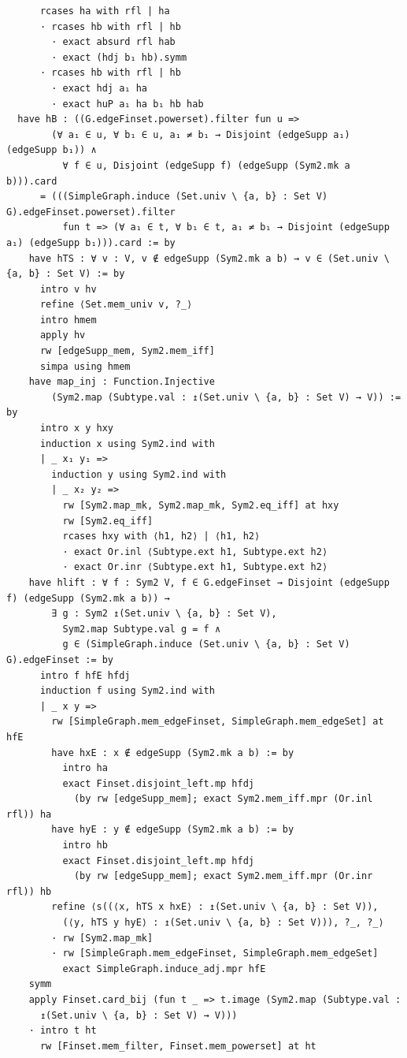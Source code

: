 \documentclass[11pt]{article}
\theoremstyle{definition}
\begin{document}
\begin{lstlisting}
      rcases ha with rfl | ha
      · rcases hb with rfl | hb
        · exact absurd rfl hab
        · exact (hdj b₁ hb).symm
      · rcases hb with rfl | hb
        · exact hdj a₁ ha
        · exact huP a₁ ha b₁ hb hab
  have hB : ((G.edgeFinset.powerset).filter fun u =>
        (∀ a₁ ∈ u, ∀ b₁ ∈ u, a₁ ≠ b₁ → Disjoint (edgeSupp a₁) (edgeSupp b₁)) ∧
          ∀ f ∈ u, Disjoint (edgeSupp f) (edgeSupp (Sym2.mk a b))).card
      = (((SimpleGraph.induce (Set.univ \ {a, b} : Set V) G).edgeFinset.powerset).filter
          fun t => (∀ a₁ ∈ t, ∀ b₁ ∈ t, a₁ ≠ b₁ → Disjoint (edgeSupp a₁) (edgeSupp b₁))).card := by
    have hTS : ∀ v : V, v ∉ edgeSupp (Sym2.mk a b) → v ∈ (Set.univ \ {a, b} : Set V) := by
      intro v hv
      refine ⟨Set.mem_univ v, ?_⟩
      intro hmem
      apply hv
      rw [edgeSupp_mem, Sym2.mem_iff]
      simpa using hmem
    have map_inj : Function.Injective
        (Sym2.map (Subtype.val : ↥(Set.univ \ {a, b} : Set V) → V)) := by
      intro x y hxy
      induction x using Sym2.ind with
      | _ x₁ y₁ =>
        induction y using Sym2.ind with
        | _ x₂ y₂ =>
          rw [Sym2.map_mk, Sym2.map_mk, Sym2.eq_iff] at hxy
          rw [Sym2.eq_iff]
          rcases hxy with ⟨h1, h2⟩ | ⟨h1, h2⟩
          · exact Or.inl ⟨Subtype.ext h1, Subtype.ext h2⟩
          · exact Or.inr ⟨Subtype.ext h1, Subtype.ext h2⟩
    have hlift : ∀ f : Sym2 V, f ∈ G.edgeFinset → Disjoint (edgeSupp f) (edgeSupp (Sym2.mk a b)) →
        ∃ g : Sym2 ↥(Set.univ \ {a, b} : Set V),
          Sym2.map Subtype.val g = f ∧
          g ∈ (SimpleGraph.induce (Set.univ \ {a, b} : Set V) G).edgeFinset := by
      intro f hfE hfdj
      induction f using Sym2.ind with
      | _ x y =>
        rw [SimpleGraph.mem_edgeFinset, SimpleGraph.mem_edgeSet] at hfE
        have hxE : x ∉ edgeSupp (Sym2.mk a b) := by
          intro ha
          exact Finset.disjoint_left.mp hfdj
            (by rw [edgeSupp_mem]; exact Sym2.mem_iff.mpr (Or.inl rfl)) ha
        have hyE : y ∉ edgeSupp (Sym2.mk a b) := by
          intro hb
          exact Finset.disjoint_left.mp hfdj
            (by rw [edgeSupp_mem]; exact Sym2.mem_iff.mpr (Or.inr rfl)) hb
        refine ⟨s((⟨x, hTS x hxE⟩ : ↥(Set.univ \ {a, b} : Set V)),
          (⟨y, hTS y hyE⟩ : ↥(Set.univ \ {a, b} : Set V))), ?_, ?_⟩
        · rw [Sym2.map_mk]
        · rw [SimpleGraph.mem_edgeFinset, SimpleGraph.mem_edgeSet]
          exact SimpleGraph.induce_adj.mpr hfE
    symm
    apply Finset.card_bij (fun t _ => t.image (Sym2.map (Subtype.val :
      ↥(Set.univ \ {a, b} : Set V) → V)))
    · intro t ht
      rw [Finset.mem_filter, Finset.mem_powerset] at ht

\end{lstlisting}
\end{document}
